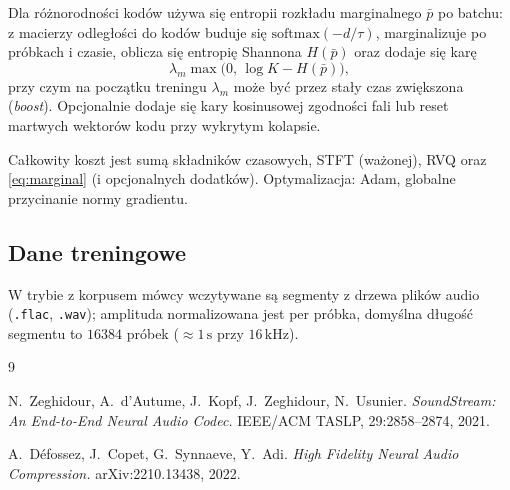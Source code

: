 \documentclass[11pt,a4paper]{article}
\begin{document}
Dla różnorodności kodów używa się entropii rozkładu marginalnego $\bar p$ po batchu: z macierzy odległości do kodów buduje się $\mathrm{softmax}(-d/\tau)$, marginalizuje po próbkach i czasie, oblicza się entropię Shannona $H(\bar p)$ oraz dodaje się karę
\begin{equation}
  \lambda_m \max\bigl(0,\, \log K - H(\bar p)\bigr),
  \label{eq:marginal}
\end{equation}
przy czym na początku treningu $\lambda_m$ może być przez stały czas zwiększona (\emph{boost}). Opcjonalnie dodaje się kary kosinusowej zgodności fali lub reset martwych wektorów kodu przy wykrytym kolapsie.

Całkowity koszt jest sumą składników czasowych, STFT (ważonej), RVQ oraz \eqref{eq:marginal} (i opcjonalnych dodatków). Optymalizacja: Adam, globalne przycinanie normy gradientu.

\subsection{Dane treningowe}

W trybie z korpusem mówcy wczytywane są segmenty z drzewa plików audio (\texttt{.flac}, \texttt{.wav}); amplituda normalizowana jest per próbka, domyślna długość segmentu to $16384$ próbek ($\approx 1\,\mathrm{s}$ przy $16\,\mathrm{kHz}$).

\begin{thebibliography}{9}

N.~Zeghidour, A.~d'Autume, J.~Kopf, J.~Zeghidour, N.~Usunier.
\newblock \emph{SoundStream: An End-to-End Neural Audio Codec.}
\newblock IEEE/ACM TASLP, 29:2858--2874, 2021.

A.~Défossez, J.~Copet, G.~Synnaeve, Y.~Adi.
\newblock \emph{High Fidelity Neural Audio Compression.}
\newblock arXiv:2210.13438, 2022.

\end{thebibliography}
\end{document}
